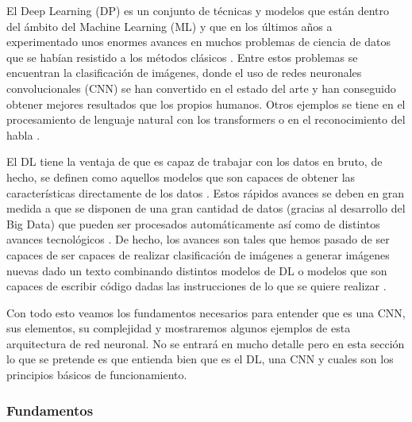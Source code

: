 \documentclass[a4paper,12pt,twoside,titlepage]{article}
\begin{document}
El Deep Learning (DP) es un conjunto de técnicas y modelos que están dentro del ámbito del Machine Learning (ML) y que en los últimos años a experimentado unos enormes avances en muchos problemas de ciencia de datos que se habían resistido a los métodos clásicos \cite{dl_nature}. Entre estos problemas se encuentran la clasificación de imágenes, donde el uso de redes neuronales convolucionales (CNN) se han convertido en el estado del arte y han conseguido obtener mejores resultados que los propios humanos. Otros ejemplos se tiene en el procesamiento de lenguaje natural con los transformers o en el reconocimiento del habla \cite{korean_dl}.

El DL tiene la ventaja de que es capaz de trabajar con los datos en bruto, de hecho, se definen como aquellos modelos que son capaces de obtener las características directamente de los datos \cite{dl_book}. Estos rápidos avances se deben en gran medida a que se disponen de una gran cantidad de datos (gracias al desarrollo del Big Data) que pueden ser procesados automáticamente así como de distintos avances tecnológicos \cite{korean_dl,dl_nature}. De hecho, los avances son tales que hemos pasado de ser capaces de ser capaces de realizar clasificación de imágenes a generar imágenes nuevas dado un texto combinando distintos modelos de DL \cite{hier} o modelos que son capaces de escribir código dadas las instrucciones de lo que se quiere realizar \cite{codex}.

Con todo esto veamos los fundamentos necesarios para entender que es una CNN, sus elementos, su complejidad y mostraremos algunos ejemplos de esta arquitectura de red neuronal. No se entrará en mucho detalle pero en esta sección lo que se pretende es que entienda bien que es el DL, una CNN y cuales son los principios básicos de funcionamiento. 

\subsubsection*{Fundamentos}
\end{document}
